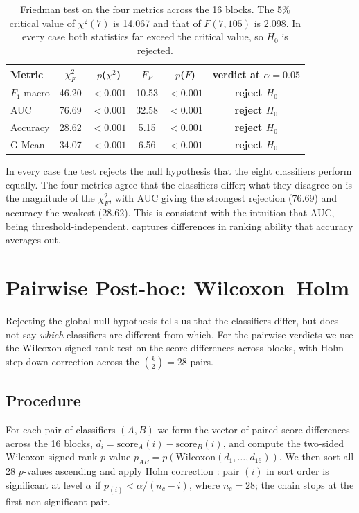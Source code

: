 \begin{table}[H]
\centering
\caption{Friedman test on the four metrics across the 16 blocks.
The 5\% critical value of $\chi^{2}(7)$ is 14.067 and that of
$F(7,105)$ is 2.098. In every case both statistics far exceed the
critical value, so $H_0$ is rejected.}
\singlespacing
\label{tab:friedman}
\small
\renewcommand{\arraystretch}{1.15}
\begin{tabular}{l c c c c c}
\toprule
\textbf{Metric} & $\chi^{2}_{F}$ & \textbf{$p$($\chi^{2}$)} & $F_{F}$ & \textbf{$p$($F$)} & \textbf{verdict at $\alpha=0.05$}\\
\midrule
$F_{1}$-macro & 46.20 & $<0.001$ & 10.53 & $<0.001$ & \textbf{reject $H_{0}$}\\
AUC & 76.69 & $<0.001$ & 32.58 & $<0.001$ & \textbf{reject $H_{0}$}\\
Accuracy & 28.62 & $<0.001$ & \phantom{0}5.15 & $<0.001$ & \textbf{reject $H_{0}$}\\
G-Mean & 34.07 & $<0.001$ & \phantom{0}6.56 & $<0.001$ & \textbf{reject $H_{0}$}\\
\bottomrule
\end{tabular}
\end{table}
In every case the test rejects the null hypothesis that the eight
classifiers perform equally. The four metrics agree that the
classifiers differ; what they disagree on is the magnitude of the
$\chi^{2}_{F}$, with AUC giving the strongest rejection (76.69)
and accuracy the weakest (28.62). This is consistent with the
intuition that AUC, being threshold-independent, captures
differences in ranking ability that accuracy averages out.

\section{Pairwise Post-hoc: Wilcoxon--Holm}
\label{sec:posthoc}

Rejecting the global null hypothesis tells us that the classifiers
differ, but does not say \emph{which} classifiers are different
from which. For the pairwise verdicts we use the Wilcoxon
signed-rank test on the score differences across blocks, with
Holm step-down correction across the $\binom{k}{2}=28$ pairs.

\subsection{Procedure}

For each pair of classifiers $(A,B)$ we form the vector of paired
score differences across the 16 blocks,
$d_i = \mathrm{score}_A(i) - \mathrm{score}_B(i)$, and compute the
two-sided Wilcoxon signed-rank $p$-value
$p_{AB}=p(\text{Wilcoxon}(d_{1},\ldots,d_{16}))$. We then sort all
28 $p$-values ascending and apply Holm correction
\citep{holm1979simple}: pair $(i)$ in sort order is significant at
level $\alpha$ if $p_{(i)} < \alpha/(n_{c}-i)$, where $n_c=28$;
the chain stops at the first non-significant pair.

